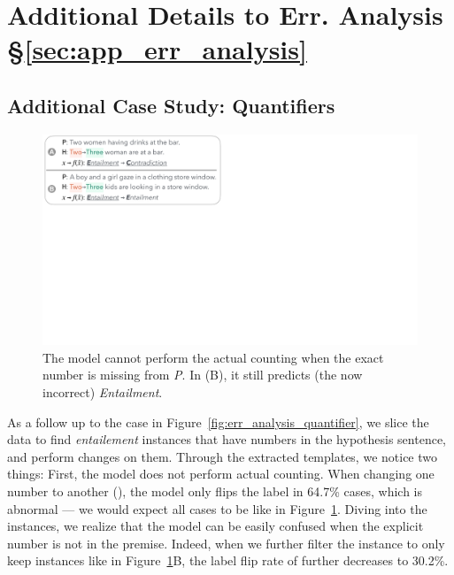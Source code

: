 \section{Additional Details to Err. Analysis \S\ref{sec:app_err_analysis}}
\label{appendix:err_analysis}

\subsection{Additional Case Study: Quantifiers}
\label{appendix:err_analysis_quantifier_case}

\begin{figure}[t]
\centering
\includegraphics[trim={0 25.2cm 34.5cm 0cm},clip,width=1\columnwidth]{figures/err_analysis_two_three}
\vspace{-15pt}
\caption{
The \nli model cannot perform the actual counting when the exact number is missing from \emph{P}.
In (B), it still predicts (the now incorrect) \emph{Entailment}.
}
\vspace{-10pt}
\label{fig:err_analysis_two_three}
\end{figure}



As a follow up to the case in Figure~\ref{fig:err_analysis_quantifier}, we slice the data to find \emph{entailement} instances that have numbers in the hypothesis sentence, and perform  changes on them.
Through the extracted templates, we notice two things: 
First, the model does not perform actual counting. 
When changing one number to another (), the model only flips the label in 64.7\% cases, which is abnormal --- we would expect all cases to be like in Figure~\ref{fig:err_analysis_two_three}.
Diving into the instances, we realize that the model can be easily confused when the explicit number is not in the premise. Indeed, when we further filter the instance to only keep instances like in Figure~\ref{fig:err_analysis_two_three}B, the label flip rate of  further decreases to 30.2\%.



